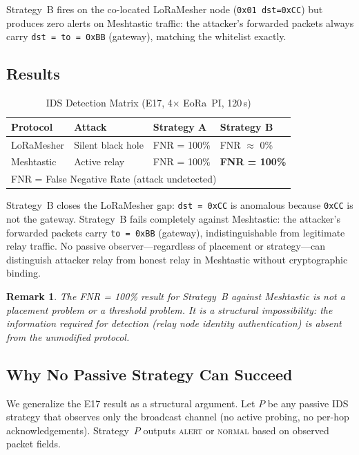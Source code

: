 \documentclass[journal]{IEEEtran}
\newtheorem{remark}{Remark}
\begin{document}
Strategy~B fires on the co-located LoRaMesher node (\texttt{0x01 dst=0xCC})
but produces zero alerts on Meshtastic traffic: the attacker's forwarded
packets always carry \texttt{dst = to = 0xBB} (gateway), matching the
whitelist exactly.

\subsection{Results}

\begin{table}[h]
  \centering
  \caption{IDS Detection Matrix (E17, 4$\times$ EoRa~PI, 120\,s)}
  \label{tab:ids}
  \begin{tabular}{llll}
    \toprule
    Protocol & Attack & Strategy A & Strategy B \\
    \midrule
    LoRaMesher & Silent black hole & FNR = 100\% & FNR $\approx$ 0\% \\
    Meshtastic & Active relay      & FNR = 100\% & \textbf{FNR = 100\%} \\
    \bottomrule
    \multicolumn{4}{l}{\footnotesize{FNR = False Negative Rate (attack undetected)}}
  \end{tabular}
\end{table}

Strategy~B closes the LoRaMesher gap: \texttt{dst = 0xCC} is anomalous
because \texttt{0xCC} is not the gateway. Strategy~B fails completely against
Meshtastic: the attacker's forwarded packets carry \texttt{to = 0xBB}
(gateway), indistinguishable from legitimate relay traffic. No passive
observer---regardless of placement or strategy---can distinguish attacker
relay from honest relay in Meshtastic without cryptographic binding.

\begin{remark}
The FNR = 100\% result for Strategy~B against Meshtastic is not a placement
problem or a threshold problem. It is a structural impossibility: the
information required for detection (relay node identity authentication) is
absent from the unmodified protocol.
\end{remark}

\subsection{Why No Passive Strategy Can Succeed}

We generalize the E17 result as a structural argument. Let $P$ be any
passive IDS strategy that observes only the broadcast channel
(no active probing, no per-hop acknowledgements). Strategy~$P$ outputs
\textsc{alert} or \textsc{normal} based on observed packet fields.
\end{document}
